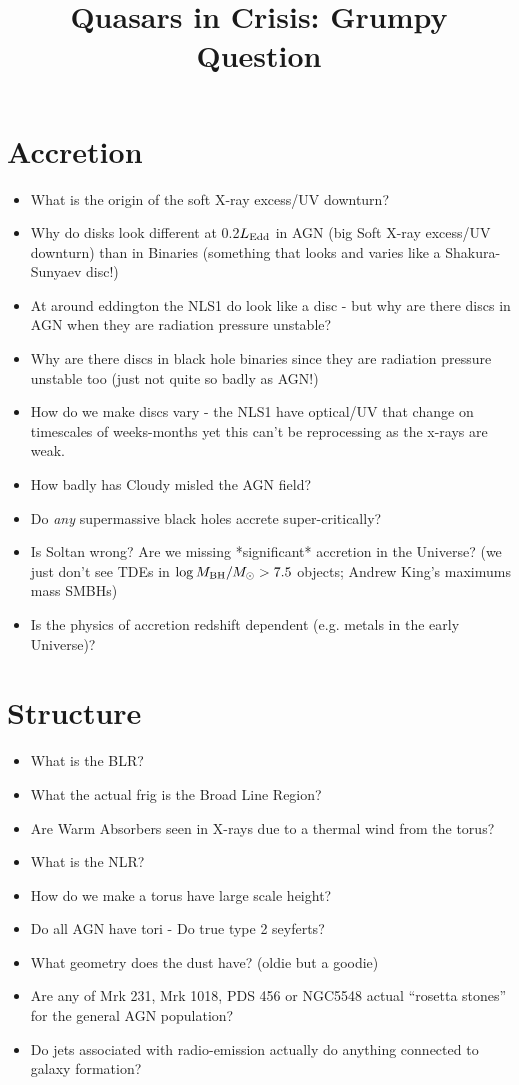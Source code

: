 \documentclass[11pt,a4paper]{article}
\begin{document}
\title{Quasars in Crisis: Grumpy Question}
\maketitle


\section*{Accretion}
\begin{itemize}
\item What is the origin of the soft X-ray excess/UV downturn? 
\item Why do disks look different at 0.2$L_{\rm Edd}$ in AGN (big Soft X-ray excess/UV downturn) than in Binaries (something that looks and varies like a Shakura-Sunyaev disc!) 
\item At around eddington the NLS1 do look like a disc - but why are there discs in AGN when 
they are radiation pressure unstable?
\item Why are there discs in  black hole binaries since they are radiation pressure unstable too (just not quite so badly as AGN!)
\item How do we make discs vary - the NLS1 have optical/UV that change on timescales of weeks-months yet this can't be reprocessing as the x-rays are weak.
\item How badly has Cloudy misled the AGN field?
\item Do {\it any} supermassive black holes accrete super-critically?
\item Is Soltan wrong?  Are we missing *significant* accretion in the Universe?
        (we just don’t see TDEs in $\log M_{\rm BH}/M_{\odot} > 7.5$ objects; 
 Andrew King’s maximums mass SMBHs) 
\item Is the physics of accretion redshift dependent (e.g. metals in the early Universe)?
\end{itemize}


\section*{Structure}
\begin{itemize}
\item What is the BLR?
\item What the actual frig is the Broad Line Region?
\item Are Warm Absorbers seen in X-rays due to a thermal wind from the torus? 
\item What is the NLR? 
\item How do we make a torus have large scale height?
\item Do all AGN have tori - Do true type 2 seyferts?
\item What geometry does the dust have? (oldie but a goodie)
\item Are any of Mrk 231, Mrk 1018, PDS 456 or NGC5548 actual “rosetta stones” for the general AGN population?
\item Do jets associated with radio-emission actually do anything connected to galaxy formation?
\end{itemize}
\end{document}
